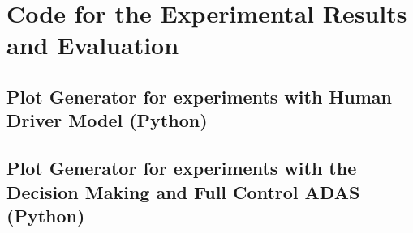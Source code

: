 \chapter{Code for the Experimental Results and Evaluation}

\section{Plot Generator for experiments with Human Driver Model (Python)}



\section{Plot Generator for experiments with the Decision Making and Full Control ADAS (Python)}

